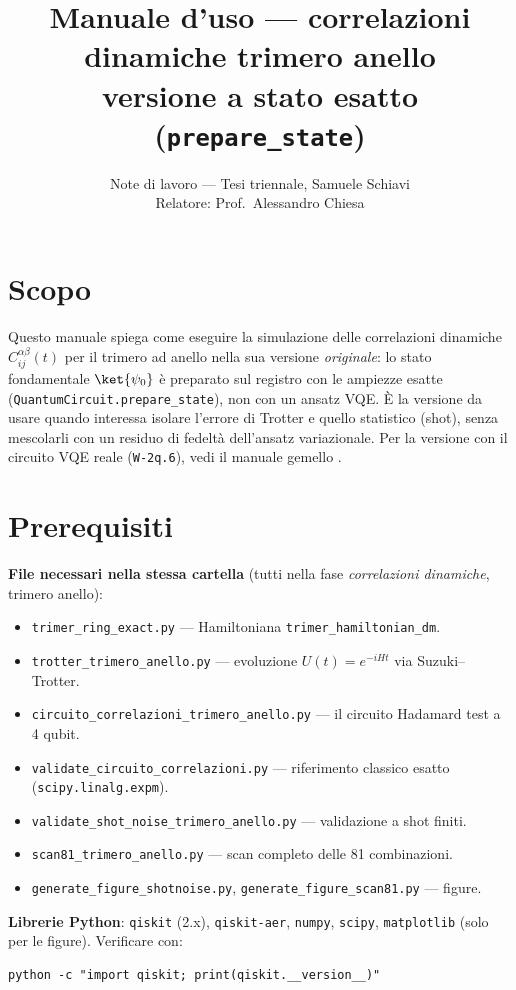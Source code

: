 \documentclass[11pt,a4paper]{article}
\title{Manuale d'uso --- correlazioni dinamiche trimero anello\\
\large versione a stato esatto (\texttt{prepare\_state})}
\author{Note di lavoro --- Tesi triennale, Samuele Schiavi\\ Relatore: Prof.\ Alessandro Chiesa}
\date{}
\begin{document}
\maketitle

\section*{Scopo}

Questo manuale spiega come eseguire la simulazione delle correlazioni dinamiche
$C_{ij}^{\alpha\beta}(t)$ per il trimero ad anello nella sua versione
\emph{originale}: lo stato fondamentale $\ket{\psi_0}$ è preparato sul registro
con le ampiezze esatte (\texttt{QuantumCircuit.prepare\_state}), non con un
ansatz VQE. È la versione da usare quando interessa isolare l'errore di
Trotter e quello statistico (shot), senza mescolarli con un residuo di
fedeltà dell'ansatz variazionale. Per la versione con il circuito VQE reale
(\texttt{W-2q.6}), vedi il manuale gemello
\texttt{}.

\section*{Prerequisiti}

\textbf{File necessari nella stessa cartella} (tutti nella fase
\emph{correlazioni dinamiche}, trimero anello):
\begin{itemize}
\item \texttt{trimer\_ring\_exact.py} --- Hamiltoniana \texttt{trimer\_hamiltonian\_dm}.
\item \texttt{trotter\_trimero\_anello.py} --- evoluzione $U(t)=e^{-iHt}$ via Suzuki--Trotter.
\item \texttt{circuito\_correlazioni\_trimero\_anello.py} --- il circuito Hadamard test a 4 qubit.
\item \texttt{validate\_circuito\_correlazioni.py} --- riferimento classico esatto (\texttt{scipy.linalg.expm}).
\item \texttt{validate\_shot\_noise\_trimero\_anello.py} --- validazione a shot finiti.
\item \texttt{scan81\_trimero\_anello.py} --- scan completo delle 81 combinazioni.
\item \texttt{generate\_figure\_shotnoise.py}, \texttt{generate\_figure\_scan81.py} --- figure.
\end{itemize}

\textbf{Librerie Python}: \texttt{qiskit} (2.x), \texttt{qiskit-aer}, \texttt{numpy},
\texttt{scipy}, \texttt{matplotlib} (solo per le figure). Verificare con:
\begin{verbatim}
python -c "import qiskit; print(qiskit.__version__)"
\end{verbatim}
\end{document}
